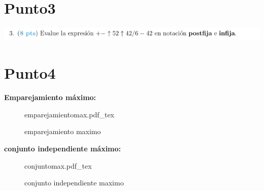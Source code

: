 \documentclass[10pt,a4paper]{article} %
\newcommand{\incfig}[1]{%
    \def\svgwidth{\columnwidth}
    {#1.pdf_tex}
}
\begin{document}
    \newpage
    \section{Punto3}
        \includegraphics[width=0.8\linewidth]{postfi.png}

    \newpage
    \section{Punto4}
        \textbf{Emparejamiento máximo:}
        \\
            \begin{figure}[ht]
                \centering
                \incfig{emparejamientomax}
                \caption{emparejamiento maximo}
                \label{fig:emparejamientomax}
            \end{figure}



        \textbf{conjunto independiente máximo:}
        \\
            \begin{figure}[ht]
                \centering
                \incfig{conjuntomax}
                \caption{conjunto independiente maximo}
                \label{fig:conjuntomax}
            \end{figure}



























    \nocite{*}
    
    
\end{document}
